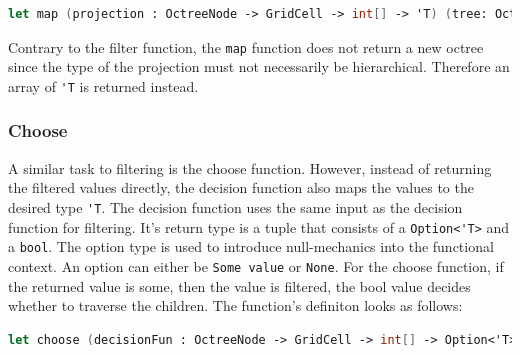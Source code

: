 \begin{lstlisting}[language = FSharp]
let map (projection : OctreeNode -> GridCell -> int[] -> 'T) (tree: Octree) : ('T[])= ...
\end{lstlisting}

Contrary to the filter function, the \verb|map| function does not return a new octree since the type of the projection must not necessarily be hierarchical. Therefore an array of \verb|'T| is returned instead. 

\subsubsection{Choose}

A similar task to filtering is the choose function. However, instead of returning the filtered values directly, the decision function also maps the values to the desired type \verb|'T|. The decision function uses the same input as the decision function for filtering. It's return type is a tuple that consists of a \verb|Option<'T>| and a \verb|bool|. The option type is used to introduce null-mechanics into the functional context. An option can either be \verb|Some value| or \verb|None|. For the choose function, if the returned value is some, then the value is filtered, the bool value decides whether to traverse the children. 
The function's definiton looks as follows: 

\begin{lstlisting}[language = FSharp]
let choose (decisionFun : OctreeNode -> GridCell -> int[] -> Option<'T>*bool) (tree: Octree) :('T[]) = ...
\end{lstlisting}


